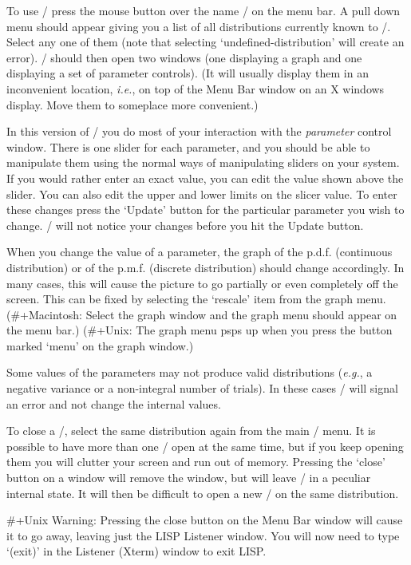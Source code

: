 
To use \disttoy/ press the mouse button over the name \disttoy/ on the
menu bar.  A pull down menu should appear giving you a list of all
distributions currently known to \eltoy/.  Select any one of them
(note that selecting `undefined-distribution' will create an error).
\disttoy/ should then open two windows (one displaying a graph and
one displaying a set of parameter controls).  (It will usually display
them in an inconvenient location, {\it i.e.}, on top of the Menu Bar
window on an X windows display.  Move them to someplace more
convenient.)

In this version of \eltoy/ you do most of your interaction with the 
{\it parameter\/} control window.  There is one slider for each
parameter, and you should be able to manipulate them using the normal
ways of manipulating sliders on your system.  If you would rather
enter an exact value, you can edit the value shown above the slider.
You can also edit the upper and lower limits on the slicer value.  To
enter these changes press the `Update' button for the particular
parameter you wish to change.  \eltoy/ will not notice your changes
before you hit the Update button.

When you change the value of a parameter, the graph of the  p.d.f.
(continuous distribution) or of the p.m.f. (discrete distribution)
should change accordingly.  In many cases, this will cause the picture
to go partially or even completely off the screen.  This can be fixed
by selecting the `rescale' item from the graph menu.
(\#+Macintosh: Select the graph window and the graph menu should
appear on the menu bar.)
(\#+Unix:  The graph menu psps up when you press the button marked
`menu' on the graph window.)  

Some values of the parameters may not
produce valid distributions
({\it e.g.}, a negative variance or a non-integral number of trials).
In these cases \eltoy/ will signal an error and not change the
internal values.

To close a \disttoy/, select the same distribution again from the main
\disttoy/ menu.  It is possible to have more than one \disttoy/ open
at the same time, but if you keep opening them you will clutter your
screen and run out of memory.  Pressing the `close' button on a window
will remove the window, but will leave \disttoy/ in a peculiar internal
state.  It will then be difficult to open a new \disttoy/ on the same
distribution.  

\#+Unix Warning:  Pressing the close button on the Menu Bar window
will cause it to go away, leaving just the LISP Listener window.  You
will now need to type `(exit)' in the Listener (Xterm) window to exit
LISP.


